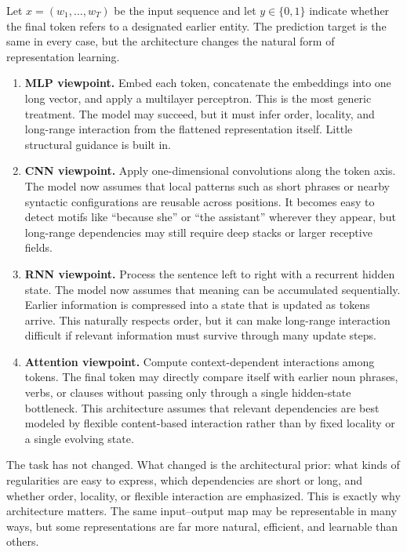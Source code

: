 \begin{example}
Let $x=(w_1,\dots,w_T)$ be the input sequence and let $y \in \{0,1\}$ indicate whether the final token refers to a designated earlier entity.
The prediction target is the same in every case, but the architecture changes the natural form of representation learning.
\begin{enumerate}
    \item \textbf{MLP viewpoint.}
    Embed each token, concatenate the embeddings into one long vector, and apply a multilayer perceptron.
    This is the most generic treatment.
    The model may succeed, but it must infer order, locality, and long-range interaction from the flattened representation itself.
    Little structural guidance is built in.

    \item \textbf{CNN viewpoint.}
    Apply one-dimensional convolutions along the token axis.
    The model now assumes that local patterns such as short phrases or nearby syntactic configurations are reusable across positions.
    It becomes easy to detect motifs like ``because she'' or ``the assistant'' wherever they appear, but long-range dependencies may still require deep stacks or larger receptive fields.

    \item \textbf{RNN viewpoint.}
    Process the sentence left to right with a recurrent hidden state.
    The model now assumes that meaning can be accumulated sequentially.
    Earlier information is compressed into a state that is updated as tokens arrive.
    This naturally respects order, but it can make long-range interaction difficult if relevant information must survive through many update steps.

    \item \textbf{Attention viewpoint.}
    Compute context-dependent interactions among tokens.
    The final token may directly compare itself with earlier noun phrases, verbs, or clauses without passing only through a single hidden-state bottleneck.
    This architecture assumes that relevant dependencies are best modeled by flexible content-based interaction rather than by fixed locality or a single evolving state.
\end{enumerate}
\end{example}

\medskip

The task has not changed.
What changed is the architectural prior:
what kinds of regularities are easy to express,
which dependencies are short or long,
and whether order, locality, or flexible interaction are emphasized.
This is exactly why architecture matters.
The same input--output map may be representable in many ways, but some representations are far more natural, efficient, and learnable than others.

